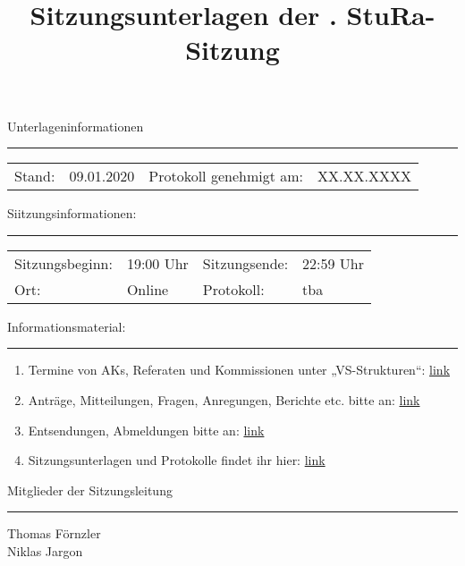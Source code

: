 \title{Sitzungsunterlagen der \eventnumber . StuRa-Sitzung}
\author{}
\date{\vspace{-2em}\datum\vspace{-1em}}
\maketitle

Unterlageninformationen
\vspace{.5em}\hrule
\begin{center}
    \begin{tabular}{m{2cm}m{3cm}m{4cm}m{3cm}}
        Stand: & 09.01.2020 & Protokoll genehmigt am: & XX.XX.XXXX\\
    \end{tabular}
\end{center}

Siitzungsinformationen:
\vspace{.5em}\hrule
\begin{center}
    \begin{tabular}{m{3cm}m{3cm}m{3cm}m{3cm}}
        Sitzungsbeginn: & 19:00 Uhr & Sitzungsende: & 22:59 Uhr\\
        Ort: & Online & Protokoll: & tba \\
    \end{tabular}
\end{center}

Informationsmaterial:
\vspace{.5em}\hrule\vspace{.5em}
\begin{enumerate}
    \item Termine von AKs, Referaten und Kommissionen unter „VS-Strukturen“: \href{https://www.stura.uni-heidelberg.de}{link}
    \item Anträge, Mitteilungen, Fragen, Anregungen, Berichte etc. bitte an: \href{mailto:sitzungsleitung@stura.uni-heidelberg.de}{link}
    \item Entsendungen, Abmeldungen bitte an: \href{mailto:entsendung@stura.uni-heidelberg.de}{link}
    \item Sitzungsunterlagen und Protokolle findet ihr hier: \href{https://www.stura.uni-heidelberg.de/vs-strukturen/studierendenrat/protokolle-antraege-beschluesse-der-8-legislatur/}{link}
\end{enumerate}
\vspace{1.5em}

Mitglieder der Sitzungsleitung
\vspace{.5em}\hrule\vspace{.5em}
Thomas Förnzler\\
Niklas Jargon
\pagebreak 